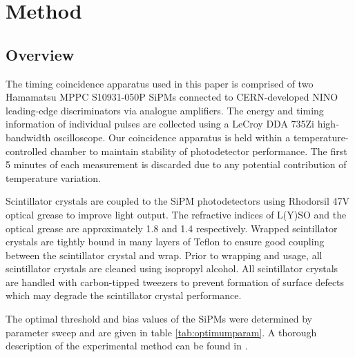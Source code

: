 \section{Method}
\label{sec:method}
\subsection{Overview}
The timing coincidence apparatus used in this paper is comprised of two Hamamatsu MPPC S10931-050P SiPMs connected to CERN-developed NINO leading-edge discriminators via analogue amplifiers. The energy and timing information of individual pulses are collected using a LeCroy DDA 735Zi high-bandwidth oscilloscope. Our coincidence apparatus is held within a temperature-controlled chamber to maintain stability of photodetector performance. The first 5 minutes of each measurement is discarded due to any potential contribution of temperature variation.

Scintillator crystals are coupled to the SiPM photodetectors using Rhodorsil 47V optical grease to improve light output. The refractive indices of L(Y)SO and the optical grease are approximately 1.8 \cite{Erdei2012} and 1.4 \cite{rhodorsilgrease} respectively. Wrapped scintillator crystals are tightly bound in many layers of Teflon to ensure good coupling between the scintillator crystal and wrap. Prior to wrapping and usage, all scintillator crystals are cleaned using isopropyl alcohol. All scintillator crystals are handled with carbon-tipped tweezers to prevent formation of surface defects which may degrade the scintillator crystal performance. 

The optimal threshold and bias values of the SiPMs were determined by parameter sweep and are given in table \ref{tab:optimumparam}. A thorough description of the experimental method can be found in \cite{ch_Meyer_Pizzichemi_Lecoq_2013}.
